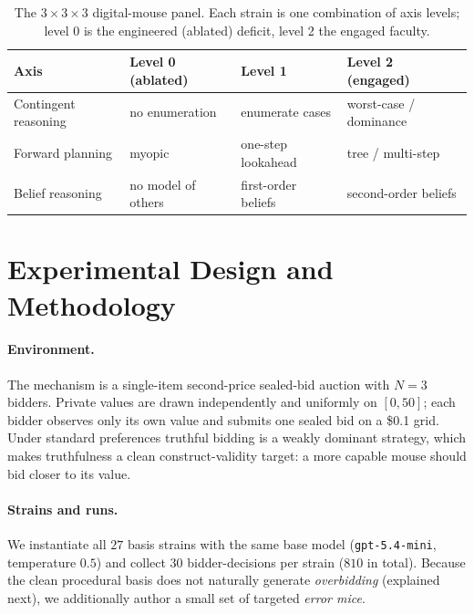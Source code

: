 \documentclass[12pt]{article}
\begin{document}
\begin{table}[t]
\centering
\caption{The $3\times3\times3$ digital-mouse panel. Each strain is one combination
of axis levels; level 0 is the engineered (ablated) deficit, level 2 the engaged
faculty.}
\label{tab:panel}
\small
\setlength{\tabcolsep}{5pt}
\begin{tabular}{@{}llll@{}}
\toprule
Axis & Level 0 (ablated) & Level 1 & Level 2 (engaged) \\
\midrule
Contingent reasoning & no enumeration & enumerate cases & worst-case / dominance \\
Forward planning     & myopic & one-step lookahead & tree / multi-step \\
Belief reasoning     & no model of others & first-order beliefs & second-order beliefs \\
\bottomrule
\end{tabular}
\end{table}

\section{Experimental Design and Methodology}
\label{sec:design}

\paragraph{Environment.} The mechanism is a single-item second-price sealed-bid
auction with $N=3$ bidders. Private values are drawn independently and uniformly on
$[0,50]$; each bidder observes only its own value and submits one sealed bid on a
\$0.1 grid. Under standard preferences truthful bidding is a weakly dominant
strategy, which makes truthfulness a clean construct-validity target: a more
capable mouse should bid closer to its value.

\paragraph{Strains and runs.} We instantiate all $27$ basis strains with the same
base model (\texttt{gpt-5.4-mini}, temperature $0.5$) and collect $30$
bidder-decisions per strain ($810$ in total). Because the clean procedural basis
does not naturally generate \emph{overbidding} (explained next), we additionally
author a small set of targeted \emph{error mice}.
\end{document}
